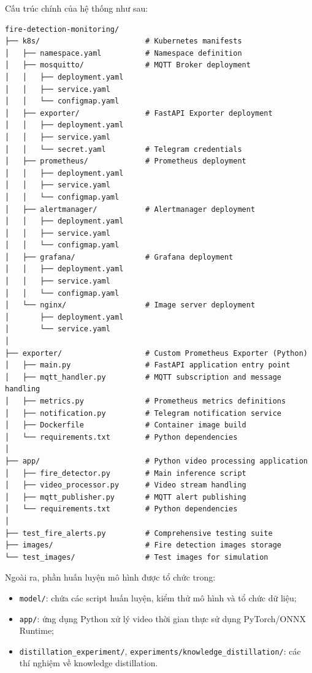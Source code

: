 \documentclass[12pt,a4paper]{report}
\begin{document}
Cấu trúc chính của hệ thống như sau:
\begin{verbatim}
fire-detection-monitoring/
├── k8s/                        # Kubernetes manifests
│   ├── namespace.yaml          # Namespace definition
│   ├── mosquitto/              # MQTT Broker deployment
│   │   ├── deployment.yaml
│   │   ├── service.yaml
│   │   └── configmap.yaml
│   ├── exporter/               # FastAPI Exporter deployment
│   │   ├── deployment.yaml
│   │   ├── service.yaml
│   │   └── secret.yaml         # Telegram credentials
│   ├── prometheus/             # Prometheus deployment
│   │   ├── deployment.yaml
│   │   ├── service.yaml
│   │   └── configmap.yaml
│   ├── alertmanager/           # Alertmanager deployment
│   │   ├── deployment.yaml
│   │   ├── service.yaml
│   │   └── configmap.yaml
│   ├── grafana/                # Grafana deployment
│   │   ├── deployment.yaml
│   │   ├── service.yaml
│   │   └── configmap.yaml
│   └── nginx/                  # Image server deployment
│       ├── deployment.yaml
│       └── service.yaml
│
├── exporter/                   # Custom Prometheus Exporter (Python)
│   ├── main.py                 # FastAPI application entry point
│   ├── mqtt_handler.py         # MQTT subscription and message handling
│   ├── metrics.py              # Prometheus metrics definitions
│   ├── notification.py         # Telegram notification service
│   ├── Dockerfile              # Container image build
│   └── requirements.txt        # Python dependencies
│
├── app/                        # Python video processing application
│   ├── fire_detector.py        # Main inference script
│   ├── video_processor.py      # Video stream handling
│   ├── mqtt_publisher.py       # MQTT alert publishing
│   └── requirements.txt        # Python dependencies
│
├── test_fire_alerts.py         # Comprehensive testing suite
├── images/                     # Fire detection images storage
└── test_images/                # Test images for simulation
\end{verbatim}

Ngoài ra, phần huấn luyện mô hình được tổ chức trong:
\begin{itemize}
  \item \texttt{model/}: chứa các script huấn luyện, kiểm thử mô hình và tổ chức dữ liệu;
  \item \texttt{app/}: ứng dụng Python xử lý video thời gian thực sử dụng PyTorch/ONNX Runtime;
  \item \texttt{distillation\_experiment/}, \texttt{experiments/knowledge\_distillation/}: các thí nghiệm về knowledge distillation.
\end{itemize}
\end{document}
